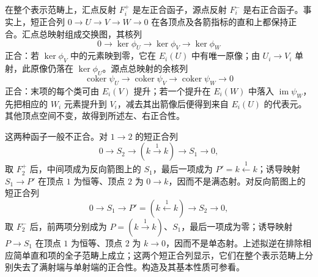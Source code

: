 \ProseParagraphBreak

在整个表示范畴上，汇点反射 \(F_i^+\) 是左正合函子，源点反射 \(F_i^-\) 是右正合函子。事实上，短正合列 \(0\to U\to V\to W\to0\) 在各顶点及各箭指标的直和上都保持正合。汇点总映射组成交换图，其核列
\[
	0\longrightarrow\ker\phi_U\longrightarrow\ker\phi_V \longrightarrow\ker\phi_W
\]
正合：若 \(\ker\phi_V\) 中的元素映到零，它在 \(E_i(U)\) 中有唯一原像；由 \(U_i\to V_i\) 单射，此原像仍落在 \(\ker\phi_U\)。源点总映射的余核列
\[
	\operatorname{coker}\psi_U\longrightarrow\operatorname{coker}\psi_V \longrightarrow\operatorname{coker}\psi_W\longrightarrow0
\]
正合：末项的每个类可由 \(E_i(V)\) 提升；若一个提升在 \(E_i(W)\) 中落入 \(\operatorname{im}\psi_W\)，先把相应的 \(W_i\) 元素提升到 \(V_i\)，减去其出箭像后便得到来自 \(E_i(U)\) 的代表元。其他顶点空间不变，故得到所述左、右正合性。

\ProseParagraphBreak

这两种函子一般不正合。对 \(1\to2\) 的短正合列
\[
	0\longrightarrow S_2\longrightarrow (k\xrightarrow{1}k)\longrightarrow S_1\longrightarrow0,
\]
取 \(F_2^+\) 后，中间项成为反向箭图上的 \(S_1\)，最后一项成为 \(P'=k\xleftarrow{1}k\)；诱导映射 \(S_1\to P'\) 在顶点 \(1\) 为恒等、顶点 \(2\) 为 \(0\to k\)，因而不是满态射。对反向箭图上的短正合列
\[
	0\longrightarrow S_1\longrightarrow P'=(k\xleftarrow{1}k)\longrightarrow S_2\longrightarrow0,
\]
取 \(F_2^-\) 后，前两项分别成为 \(P=(k\xrightarrow{1}k)\)、\(S_1\)，最后一项成为零；诱导映射 \(P\to S_1\) 在顶点 \(1\) 为恒等、顶点 \(2\) 为 \(k\to0\)，因而不是单态射。上述拟逆在排除相应简单直和项的全子范畴上成立；这两个短正合列显示，它们在整个表示范畴上分别失去了满射端与单射端的正合性。构造及其基本性质可参看\cite[Section 6.6, pp. 164--169]{EtingofEtAl2011RepresentationTheory}。
